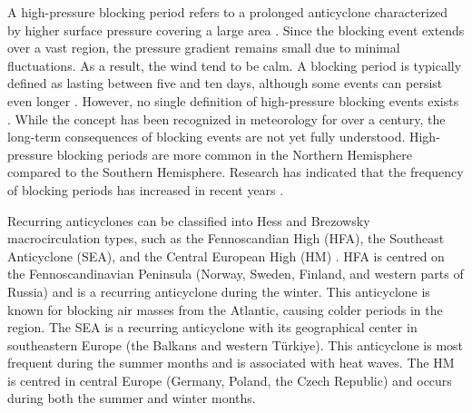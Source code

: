 A high-pressure blocking period refers to a prolonged anticyclone characterized by higher surface pressure covering a large area \cite{lupoAtmosphericBlockingEvents2020}. Since the blocking event extends over a vast region, the pressure gradient remains small due to minimal fluctuations. As a result, the wind tend to be calm. A blocking period is typically defined as lasting between five and ten days, although some events can persist even longer \cite{porebskaAnalysisExtremeTemperature2013}. However, no single definition of high-pressure blocking events exists \cite{lupoAtmosphericBlockingEvents2020}. While the concept has been recognized in meteorology for over a century, the long-term consequences of blocking events are not yet fully understood. High-pressure blocking periods are more common in the Northern Hemisphere compared to the Southern Hemisphere. Research has indicated that the frequency of blocking periods has increased in recent years \cite{lupoAtmosphericBlockingEvents2020}. 

Recurring anticyclones can be classified into Hess and Brezowsky macrocirculation types, such as the Fennoscandian High (HFA), the Southeast Anticyclone (SEA), and the Central European High (HM) \cite{bartholyEuropeanCycloneTrack2006}. HFA is centred on the Fennoscandinavian Peninsula (Norway, Sweden, Finland, and western parts of Russia) and is a recurring anticyclone during the winter. This anticyclone is known for blocking air masses from the Atlantic, causing colder periods in the region. The SEA is a recurring anticyclone with its geographical center in southeastern Europe (the Balkans and western Türkiye). This anticyclone is most frequent during the summer months and is associated with heat waves. The HM is centred in central Europe (Germany, Poland, the Czech Republic) and occurs during both the summer and winter months.

